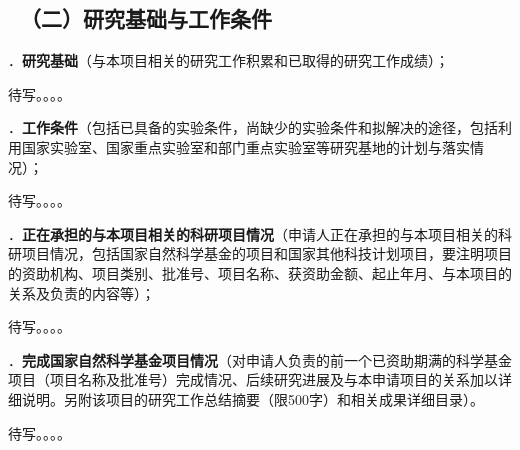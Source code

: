 {\color{MsBlue} \subsection{\texorpdfstring{\sihao \kaishu \quad \ （二）研究基础与工作条件 }{（二）研究基础与工作条件 }}}


{\sihao \color{MsBlue} ．{\bfseries 研究基础}（与本项目相关的研究工作积累和已取得的研究工作成绩）；}

待写。。。。

\vskip 5mm



{\sihao \color{MsBlue} ．{\bfseries 工作条件}（包括已具备的实验条件，尚缺少的实验条件和拟解决的途径，包括利用国家实验室、国家重点实验室和部门重点实验室等研究基地的计划与落实情况）；}

待写。。。。

\vskip 5mm



{\sihao \color{MsBlue} ．{\bfseries 正在承担的与本项目相关的科研项目情况}（申请人正在承担的与本项目相关的科研项目情况，包括国家自然科学基金的项目和国家其他科技计划项目，要注明项目的资助机构、项目类别、批准号、项目名称、获资助金额、起止年月、与本项目的关系及负责的内容等）；}

待写。。。。

\vskip 5mm



{\sihao \color{MsBlue} ．{\bfseries 完成国家自然科学基金项目情况}（对申请人负责的前一个已资助期满的科学基金项目（项目名称及批准号）完成情况、后续研究进展及与本申请项目的关系加以详细说明。另附该项目的研究工作总结摘要（限500字）和相关成果详细目录）。}

待写。。。。

\vskip 5mm
